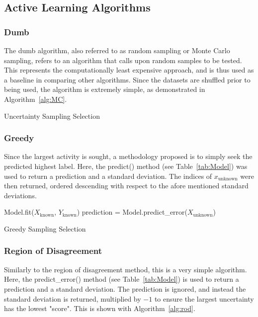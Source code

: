     \subsection{Active Learning Algorithms}

    \subsubsection{Dumb}

    The dumb algorithm, also referred to as random sampling or Monte Carlo sampling, refers to an algorithm that calls upon random samples to be tested. This represents the computationally least expensive approach, and is thus used as a baseline in comparing other algorithms. Since the datasets are shuffled prior to being used, the algorithm is extremely simple, as demonstrated in Algorithm~\ref{alg:MC}.

    \begin{algorithm}[H]
        \caption{Uncertainty Sampling Selection}
        \label{alg:MC}\SetAlgoLined
    \end{algorithm}

    \subsubsection{Greedy}
    Since the largest activity is sought, a methodology proposed is to simply seek the predicted highest label. Here, the predict() method (see Table~\ref{tab:Model}) was used to return a prediction and a standard deviation. The indices of $x_\mathrm{unknown}$ were then returned, ordered descending with respect to the afore mentioned standard deviations.

    \begin{algorithm}[H]
        Model.fit($X_\mathrm{known}$, $Y_\mathrm{known}$)\;
        prediction = Model.predict\_error($X_\mathrm{unknown}$)\;
        \caption{Greedy Sampling Selection}
        \label{alg:greedy}\SetAlgoLined
    \end{algorithm}

    \subsubsection{Region of Disagreement}
    Similarly to the region of disagreement method, this is a very simple algorithm. Here, the predict\_error() method (see Table~\ref{tab:Model}) is used to return a prediction and a standard deviation. The prediction is ignored, and instead the standard deviation is returned, multiplied by $-1$ to ensure the largest uncertainty has the lowest "score". This is shown with Algorithm~\ref{alg:rod}.

